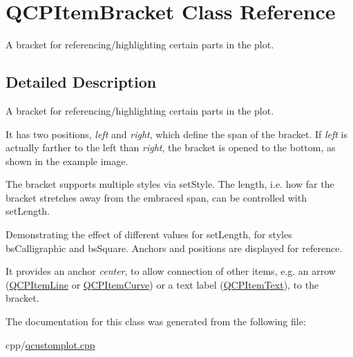 \hypertarget{class_q_c_p_item_bracket}{}\section{Q\+C\+P\+Item\+Bracket Class Reference}
\label{class_q_c_p_item_bracket}


A bracket for referencing/highlighting certain parts in the plot.  




\subsection{Detailed Description}
A bracket for referencing/highlighting certain parts in the plot. 

 It has two positions, {\itshape left} and {\itshape right}, which define the span of the bracket. If {\itshape left} is actually farther to the left than {\itshape right}, the bracket is opened to the bottom, as shown in the example image.

The bracket supports multiple styles via set\+Style. The length, i.\+e. how far the bracket stretches away from the embraced span, can be controlled with set\+Length.

 \begin{center}Demonstrating the effect of different values for set\+Length, for styles bs\+Calligraphic and bs\+Square. Anchors and positions are displayed for reference.\end{center} 

It provides an anchor {\itshape center}, to allow connection of other items, e.\+g. an arrow (\mbox{\hyperlink{class_q_c_p_item_line}{Q\+C\+P\+Item\+Line}} or \mbox{\hyperlink{class_q_c_p_item_curve}{Q\+C\+P\+Item\+Curve}}) or a text label (\mbox{\hyperlink{class_q_c_p_item_text}{Q\+C\+P\+Item\+Text}}), to the bracket. 

The documentation for this class was generated from the following file\+:\begin{DoxyCompactItemize}
\item 
cpp/\mbox{\hyperlink{qcustomplot_8cpp}{qcustomplot.\+cpp}}\end{DoxyCompactItemize}
